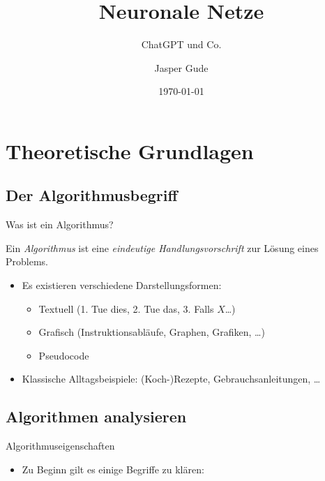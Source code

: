 \documentclass[aspectratio=169,usepdftitle=true]{beamer}
\title{Neuronale Netze}
\subtitle{ChatGPT und Co.}
\institute{Carl-Friedrich-Gauß-Gymnasium}
\date{\today}
\author{Jasper Gude}
\begin{document}
\section{Theoretische Grundlagen}
\subsection{Der Algorithmusbegriff}
\begin{frame}{Was ist ein Algorithmus?}
    \begin{definition}[Algorithmus]
        Ein \emph{Algorithmus} ist eine \emph{eindeutige Handlungsvorschrift} zur Lösung eines Problems.
    \end{definition}
    \begin{itemize}
        \item Es existieren verschiedene Darstellungsformen: \begin{itemize}
            \item Textuell (1. Tue dies, 2. Tue das, 3. Falls \(X\)\ldots)
            \item Grafisch (Instruktionsabläufe, Graphen, Grafiken, \ldots)
            \item Pseudocode
        \end{itemize}
        \item Klassische Alltagsbeispiele: (Koch-)Rezepte, Gebrauchsanleitungen, \ldots
    \end{itemize}
\end{frame}

\subsection{Algorithmen analysieren}
\begin{frame}{Algorithmuseigenschaften}
    \begin{itemize}
        \item Zu Beginn gilt es einige Begriffe zu klären: 
    \end{itemize}
\end{frame}
\end{document}
